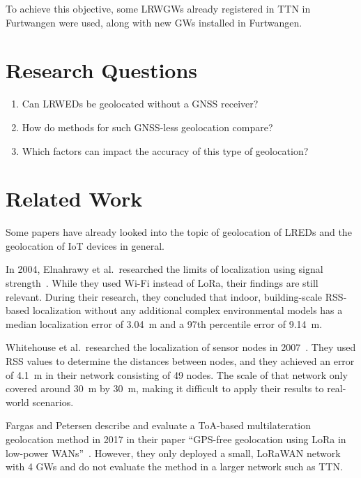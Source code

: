To achieve this objective, some \aclp{LRWGW} already registered in \acf{TTN} in Furtwangen were used, along with new \aclp{GW} installed in Furtwangen.

\section{Research Questions}\label{sec:introduction-research-questions}

\begin{enumerate}
      \item Can \aclp{LRWED} be geolocated without a \ac{GNSS} receiver?
      \item How do methods for such \ac{GNSS}-less geolocation compare?
      \item Which factors can impact the accuracy of this type of geolocation?
\end{enumerate}

\section{Related Work}\label{sec:related-work}

Some papers have already looked into the topic of geolocation of \aclp{LRED} and the geolocation of \ac{IoT} devices in general.

In 2004, Elnahrawy et al.\ researched the limits of localization using signal strength~\cite{elnahrawy_limits_2004}.
While they used Wi-Fi instead of \ac{LoRa}, their findings are still relevant.
During their research, they concluded that indoor, building-scale \ac{RSS}-based localization without any additional complex environmental models has a median localization error of \SI{3.04}{\meter} and a 97th percentile error of \SI{9.14}{\meter}.

Whitehouse et al.\ researched the localization of sensor nodes in 2007~\cite{whitehouse_practical_2007}.
They used \ac{RSS} values to determine the distances between nodes, and they achieved an error of \SI{4.1}{\meter} in their network consisting of 49 nodes.
The scale of that network only covered around \SI{30}{\meter} by \SI{30}{\meter}, making it difficult to apply their results to real-world scenarios.

Fargas and Petersen describe and evaluate a \ac{ToA}-based multilateration geolocation method in 2017 in their paper ``\acs{GPS}-free geolocation using \acs{LoRa} in low-power \acsp{WAN}''~\cite{fargas_gps-free_2017}.
However, they only deployed a small, \ac{LoRaWAN} network with 4 \aclp{GW} and do not evaluate the method in a larger network such as \ac{TTN}.

